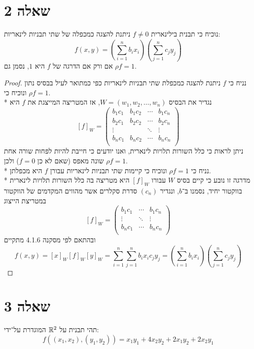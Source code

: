\section{שאלה 2}
נוכיח כי תבנית בילינארית $f \ne 0$ ניתנת להצגה כמכפלה של שתי תבניות לינאריות:
\[
	f(x, y) = \left( \sum_{i = 1}^n b_i x_i \right) \left(\sum_{j = 1}^n c_j y_j \right)
\]
אם ורק אם הדרגה של $f$ היא $1$, נסמן גם $\rho f = 1$.
\begin{proof}
	נניח כי $f$ ניתנת להצגה כמכפלת שתי תבניות לינאריות כפי כמתואר לעיל בבסיס נתון ונוכיח כי $\rho f = 1$. \\*
	נגדיר את הבסיס $W = (w_1, w_2, \hdots, w_n)$, אז המטריצה המייצגת את $f$ היא
	\[
		{[f]}_W = \begin{pmatrix}
			b_1 c_1 & b_1 c_2 & \cdots & b_1 c_n \\
			b_2 c_1 & b_2 c_2 & \cdots & b_2 c_n \\
			\vdots & & \ddots & \vdots \\
			b_n c_1 & b_n c_2 & \cdots & b_n c_n \\
		\end{pmatrix}
	\]
	ניתן לראות כי כלל השורות תלויות לינארית, ואנו יודעים כי חייבת להיות לפחות שורה אחת שונה מאפס (שאם לא כן $f = 0$) ולכן $\rho f = 1$. \\*
	נניח כי $\rho f = 1$ ונוכיח כי קיימות שתי תבניות לינאריות עבורן $f$ היא מכפלתן. \\*
	מדרגה זו נובע כי קיים בסיס $W$ עבורו ${[f]}_W$ היא מטריצה בה כלל השורות תלויות לינארית בווקטור יחיד, נסמנו ב־$b$,
	ונגדיר $(c_n)$ סדרת סקלרים אשר מהווים המקדמים של הווקטור במטריצת הייצוג
	\[
		{[f]}_W = \begin{pmatrix}
			b_1 c_1 & \cdots & b_1 c_n \\
			\vdots & \ddots & \vdots \\
			b_n c_1 & \cdots & b_n c_n \\
		\end{pmatrix}
	\]
	ובהתאם לפי מסקנה 4.1.6 מתקיים
	\[
		f(x, y)
		= {[x]}_W {[f]}_W {[y]}_W
		= \sum_{i = 1}^n \sum_{j = 1}^n b_i x_i c_j y_j
		= \left( \sum_{i = 1}^n b_i x_i \right) \left(\sum_{j = 1}^n c_j y_j \right)
	\]
\end{proof}

\section{שאלה 3}
תהי תבנית על $\mathbb{R}^2$ המוגדרת על־ידי:
\[
	f\left( (x_1, x_2), (y_1, y_2) \right) = x_1 y_1 + 4 x_2 y_2 + 2 x_1 y_2 + 2x_2 y_1
\]

